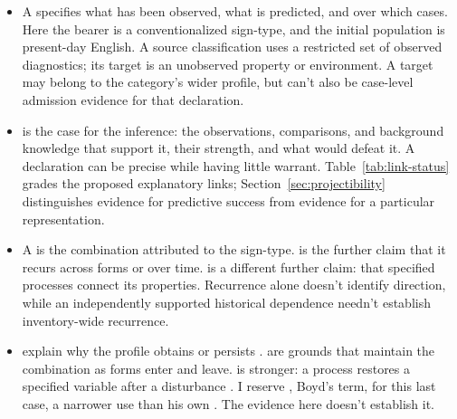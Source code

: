 \documentclass[12pt]{article}
\begin{document}
\begin{itemize}
\item A  specifies what has been observed, what is predicted, and over which cases. Here the bearer is a conventionalized sign-type, and the initial population is present-day English. A source classification uses a restricted set of observed diagnostics; its target is an unobserved property or environment. A target may belong to the category's wider profile, but can't also be case-level admission evidence for that declaration.
\item {} is the case for the inference: the observations, comparisons, and background knowledge that support it, their strength, and what would defeat it. A declaration can be precise while having little warrant. Table~\ref{tab:link-status} grades the proposed explanatory links; Section~\ref{sec:projectibility} distinguishes evidence for predictive success from evidence for a particular representation.
\item A  is the combination attributed to the sign-type.  is the further claim that it recurs across forms or over time.  is a different further claim: that specified processes connect its properties. Recurrence alone doesn't identify direction, while an independently supported historical dependence needn't establish inventory-wide recurrence.
\item {} explain why the profile obtains or persists \citep[12]{reynolds2026projectibilityHistory}.  are grounds that maintain the combination as forms enter and leave.  is stronger: a process restores a specified variable after a disturbance \citep[5]{reynolds2026notEveryStableCluster}. I reserve , Boyd's term, for this last case, a narrower use than his own \citep[143]{boyd1999}. The evidence here doesn't establish it.
\end{itemize}
\end{document}
